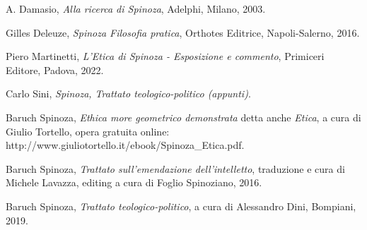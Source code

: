 \begin{thebibliography}{9}
	A. Damasio, \textit{Alla ricerca di Spinoza}, Adelphi, Milano, 2003.

	Gilles Deleuze, \textit{Spinoza Filosofia pratica}, Orthotes Editrice, Napoli-Salerno, 2016.
	
	Piero Martinetti, \textit{L'Etica di Spinoza - Esposizione e commento}, Primiceri Editore, Padova, 2022.

	Carlo Sini, \textit{Spinoza, Trattato teologico-politico (appunti)}.

	Baruch Spinoza, \textit{Ethica more geometrico demonstrata} detta anche \textit{Etica}, a cura di Giulio Tortello, opera gratuita online: http://www.giuliotortello.it/ebook/Spinoza\_Etica.pdf.
	
	Baruch Spinoza, \textit{Trattato sull'emendazione dell'intelletto}, traduzione e cura di Michele Lavazza, editing a cura di Foglio Spinoziano, 2016.
	
	Baruch Spinoza, \textit{Trattato teologico-politico}, a cura di Alessandro Dini, Bompiani, 2019.

\end{thebibliography}
\newpage